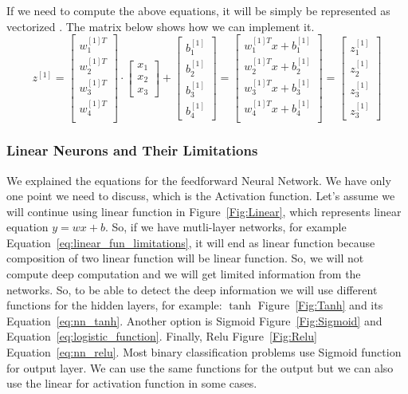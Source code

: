 If we need to compute the above equations, it will be simply be represented as vectorized . The matrix below shows how we can implement it.%
\[
z^{[1]} = 
\left[
 \begin{array}{ccc}
   w^{[1]T}_{1} \\
   w^{[1]T}_{2} \\
   w^{[1]T}_{3} \\
   w^{[1]T}_{4} \\ 
 \end{array}
\right]\cdot
\left[
 \begin{array}{c}
  x_{1} \\
  x_{2} \\
  x_{3} %
 \end{array}
\right] +
\left[
 \begin{array}{c}
  b_{1}^{[1]}\\
  b_{2}^{[1]}\\
  b_{3}^{[1]}\\
  b_{4}^{[1]}
 \end{array}
\right] =
\left[
 \begin{array}{cccc}
   w^{[1]T}_{1} x + b _1^{[1]}\\
   w^{[1]T}_{2} x + b _2^{[1] }\\
   w^{[1]T}_{3} x + b _3^{[1] }\\
   w^{[1]T}_{4} x + b _4^{[1] }\\ 
 \end{array}
\right] =
\left[
 \begin{array}{c}
  z_1^{[1]} \\
  z_2^{[1]} \\
  z_3^{[1]} \\
  z_3^{[1]}
 \end{array}
\right]
\]%
\subsubsection{Linear Neurons and Their Limitations}

We explained the equations for the feedforward Neural Network. We have only one point we need to discuss, which is the Activation function. Let's assume we will continue using linear function in Figure~\ref{Fig:Linear}, which represents linear equation  $y= w x + b$. So, if we have mutli-layer networks, for example Equation~\eqref{eq:linear_fun_limitations}, it will end as linear function because composition of two linear function will be linear function. So, we will not compute deep computation and we will get limited information from the networks. So, to be able to detect the deep information we will use different functions for the hidden layers, for example: $\tanh$ Figure~\ref{Fig:Tanh} and its Equation~\eqref{eq:nn_tanh}. Another option is Sigmoid Figure~\ref{Fig:Sigmoid} and  Equation~\eqref{eq:logistic_function}. Finally, Relu Figure~\ref{Fig:Relu} Equation~\eqref{eq:nn_relu}. Most binary classification problems use Sigmoid function for output layer. We can use the same functions for the output but we can also use the linear for activation function in some cases.%

